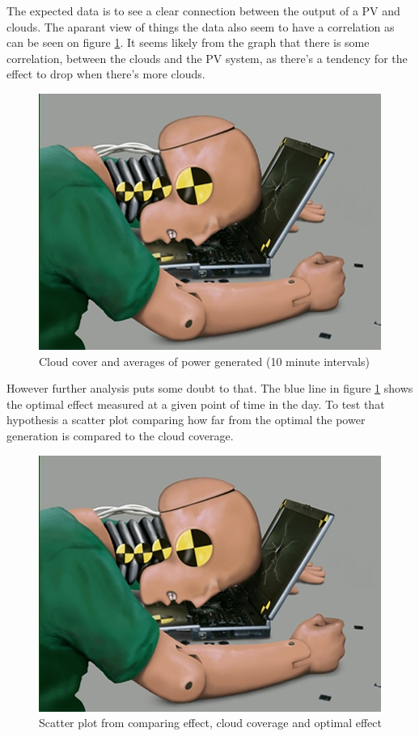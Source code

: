 The expected data is to see a clear connection between the output of a
PV and clouds\citep{southafrica}.  The aparant view of things the data
also seem to have a correlation as can be seen on figure
\ref{fig:cloudsAndPower}.  It seems likely from the graph that there
is some correlation, between the clouds and the PV system, as there's
a tendency for the effect to drop when there's more clouds.

\begin{figure}[h]
  \centering
  \includegraphics{dummy.jpg}
  \caption{Cloud cover and averages of power generated (10 minute
    intervals)}
  \label{fig:cloudsAndPower}
\end{figure}

However further analysis puts some doubt to that.  The blue line in
figure \ref{fig:cloudsAndPower} shows the optimal effect measured at a
given point of time in the day.  To test that hypothesis a scatter
plot comparing how far from the optimal the power generation is
compared to the cloud coverage.

\begin{figure}[h]
  \centering
  \includegraphics{dummy.jpg}
  \caption{Scatter plot from comparing effect, cloud coverage and
    optimal effect}
  \label{fig:fractiles}
\end{figure}

